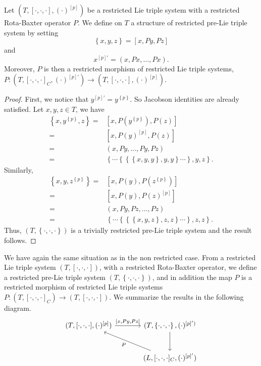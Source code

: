 \documentclass[11pt, twoside]{article}
\begin{document}
\begin{prop}\label{p5.20}
    Let $(T,[\cdot,\cdot,\cdot],(\cdot)^{[p]})$ be a restricted Lie triple system with a restricted Rota-Baxter operator $P$. We  define on $T$ a structure of restricted pre-Lie triple system by setting $$\left\{ x,y,z\right\}= [x,Py,Pz] $$ and $$x^{[p]'}= (x,Px,\ldots, Px). $$ Moreover, $P$ is then a restricted morphism of restricted Lie triple systems, $P: (T,[\cdot,\cdot,\cdot]_C,(\cdot)^{[p]'})\to (T,[\cdot,\cdot,\cdot],(\cdot)^{[p]}) $.
\end{prop}

\begin{proof}
    First, we notice that $y^{[p]'}=y^{\left\{p\right\}} $.  So Jacobson identities are already satisfied. Let $x,y,z\in T$, we have \begin{align*}
        \left\{ x,y^{\left\{p\right\}},z\right\}=& [x,P(y^{\left\{p\right\}}),P(z)] \\ =&[x,P(y)^{[p]},P(z)]\\ =& (x,Py,\ldots,Py,Pz) \\ = &\left\{\cdots \left\{\left\{\left\{ x,y,y\right\},y,y \right\}\cdots\right\},y,z\right\}. \end{align*} Similarly, \begin{align*}
            \left\{ x,y,z^{\left\{p\right\}}\right\}=& [x,P(y),P(z^{\left\{p\right\}})] \\ =&[x,P(y),P(z)^{[p]}]\\ =& (x,Py,Pz,\ldots,Pz) \\ = &\left\{\cdots \left\{\left\{\left\{ x,y,z\right\},z,z \right\}\cdots\right\},z,z\right\}. \end{align*}
        Thus, $(T,\left\{\cdot,\cdot,\cdot \right\})$ is a trivially restricted pre-Lie triple system and the result follows.
\end{proof}

We have again the same situation as in the non restricted case. From a restricted Lie triple system $(T,[\cdot,\cdot,\cdot])$, with a restricted Rota-Baxter operator, we define a restricted pre-Lie triple system $(T,\left\{ \cdot,\cdot,\cdot\right\}) $, and in addition the map $P$ is a restricted morphism of restricted Lie triple systems $P:(T,[\cdot,\cdot,\cdot]_C)\to (T,[\cdot,\cdot,\cdot]) $.
We summarize the results in the following diagram. 
\[\begin{tikzcd}[row sep=large, column sep=large]
	{(T,[\cdot,\cdot,\cdot],(\cdot)^{[p]})} & {(T,\left\{\cdot,\cdot,\cdot \right\},(\cdot)^{[p]')}} \\
	& {(L,[\cdot,\cdot,\cdot]_C,(\cdot)^{[p]'})}
	\arrow["{[x,Py,Pz]}", from=1-1, to=1-2]
	\arrow[from=1-2, to=2-2]
	\arrow["P", from=2-2, to=1-1]
\end{tikzcd}\]
\end{document}
